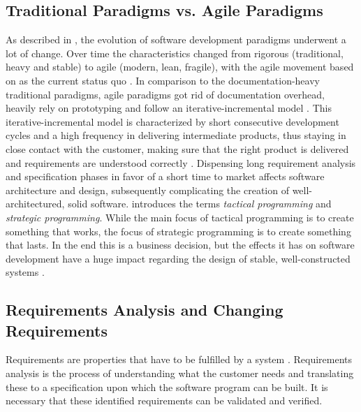 \subsection{Traditional Paradigms vs. Agile Paradigms}
\label{sub:traditional-vs-agile}
As described in \textcite{mayr_projekt_2005}, the evolution of software development paradigms underwent a lot of change.
Over time the characteristics changed from rigorous (traditional, heavy and stable) to agile (modern, lean, fragile), with the agile movement based on \textcite{fowler_agile_2000} as the current status quo \autocite{ousterhout_philosophy_2018}.
In comparison to the documentation-heavy traditional paradigms, agile paradigms got rid of documentation overhead, heavily rely on prototyping and follow an iterative-incremental model \autocite{mayr_projekt_2005}.
This iterative-incremental model is characterized by short consecutive development cycles and a high frequency in delivering intermediate products, thus staying in close contact with the customer, making sure that the right product is delivered and requirements are understood correctly \autocite{mayr_projekt_2005}.
Dispensing long requirement analysis and specification phases in favor of a short time to market affects software architecture and design, subsequently complicating the creation of well-architectured, solid software.
\textcite{ousterhout_philosophy_2018} introduces the terms \emph{tactical programming} and \emph{strategic programming}.
While the main focus of tactical programming is to create something that works, the focus of strategic programming is to create something that lasts.
In the end this is a business decision, but the effects it has on software development have a huge impact regarding the design of stable, well-constructed systems \autocite{ousterhout_philosophy_2018}.

\subsection{Requirements Analysis and Changing Requirements}
\label{sub:requirements-analysis}
Requirements are properties that have to be fulfilled by a system \autocite{mayr_projekt_2005}.
Requirements analysis is the process of understanding what the customer needs and translating these to a specification upon which the software program can be built.
It is necessary that these identified requirements can be validated and verified.

